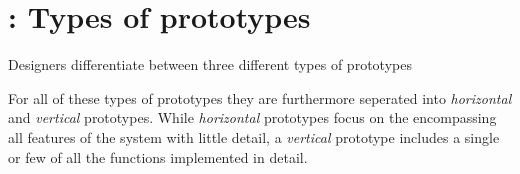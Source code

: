 \section{\todo : Types of prototypes} \label{sec:types_of_prototypes}
Designers differentiate between three different types of prototypes





\noindent For all of these types of prototypes they are furthermore seperated into \emph{horizontal} and \emph{vertical} prototypes. While \emph{horizontal} prototypes focus on the encompassing all features of the system with little detail, a \emph{vertical} prototype includes a single or few of all the functions implemented in detail. \cite[p. 179]{benyon14}
 

